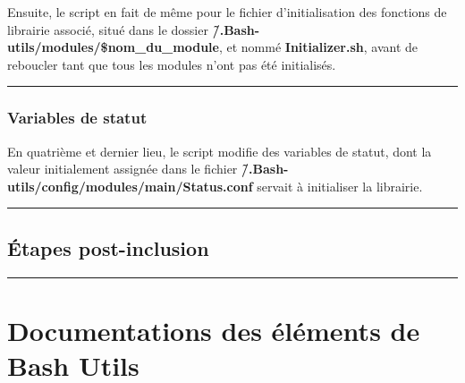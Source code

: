 \documentclass[a4paper,10pt]{article}
\begin{document}
\begin{justify}
    Ensuite, le script en fait de même pour le fichier d'initialisation des fonctions de librairie associé, situé dans le dossier \textbf{\color{path}\~/.Bash-utils/modules/\$nom\_du\_module}, et nommé \textbf{\color{path}Initializer.sh}, avant de reboucler tant que tous les modules n'ont pas été initialisés.
\end{justify}


\color{sec3}\par\noindent\rule{\textwidth}{0.4pt}\color{text}

\color{sec3}
\subsubsection{Variables de statut}\color{text}

\begin{justify}
    En quatrième et dernier lieu, le script modifie des variables de statut, dont la valeur initialement assignée dans le fichier \textbf{\color{path}\~/.Bash-utils/config/modules/main/Status.conf} servait à initialiser la librairie.
\end{justify}




\color{sec2}\par\noindent\rule{\textwidth}{0.4pt}\color{text}

\color{sec2}
\subsection{Étapes post-inclusion}\color{text}





\color{sec1}\par\noindent\rule{\textwidth}{0.4pt}\color{text}

\color{sec1}
\section{Documentations des éléments de Bash Utils}\color{text}
\end{document}
